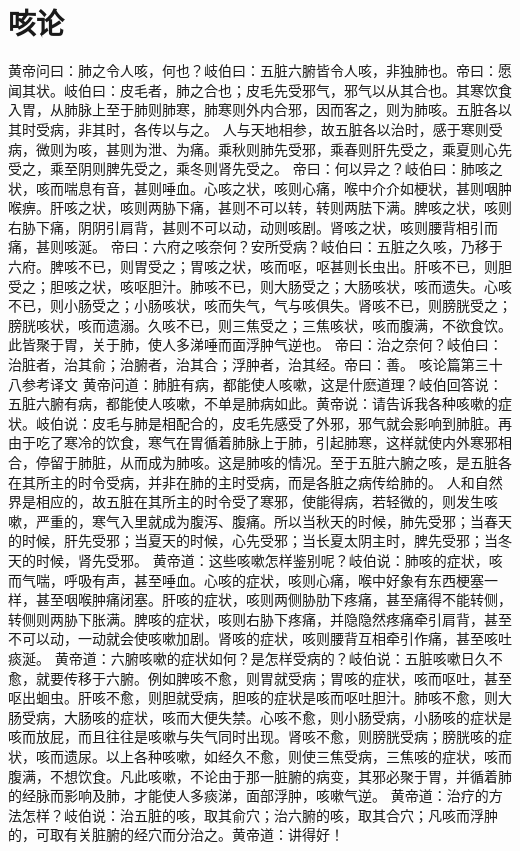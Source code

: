 \documentclass[a4paper,12pt,UTF8,twoside]{ctexbook}
\begin{document}
\chapter{咳论}
黄帝问曰：肺之令人咳，何也？岐伯曰：五脏六腑皆令人咳，非独肺也。帝曰：愿闻其状。岐伯曰：皮毛者，肺之合也；皮毛先受邪气，邪气以从其合也。其寒饮食入胃，从肺脉上至于肺则肺寒，肺寒则外内合邪，因而客之，则为肺咳。五脏各以其时受病，非其时，各传以与之。
人与天地相参，故五脏各以治时，感于寒则受病，微则为咳，甚则为泄、为痛。乘秋则肺先受邪，乘春则肝先受之，乘夏则心先受之，乘至阴则脾先受之，乘冬则肾先受之。
帝曰：何以异之？岐伯曰：肺咳之状，咳而喘息有音，甚则唾血。心咳之状，咳则心痛，喉中介介如梗状，甚则咽肿喉痹。肝咳之状，咳则两胁下痛，甚则不可以转，转则两胠下满。脾咳之状，咳则右胁下痛，阴阴引肩背，甚则不可以动，动则咳剧。肾咳之状，咳则腰背相引而痛，甚则咳涎。
帝曰：六府之咳奈何？安所受病？岐伯曰：五脏之久咳，乃移于六府。脾咳不已，则胃受之；胃咳之状，咳而呕，呕甚则长虫出。肝咳不已，则胆受之；胆咳之状，咳呕胆汁。肺咳不已，则大肠受之；大肠咳状，咳而遗失。心咳不已，则小肠受之；小肠咳状，咳而失气，气与咳俱失。肾咳不已，则膀胱受之；膀胱咳状，咳而遗溺。久咳不已，则三焦受之；三焦咳状，咳而腹满，不欲食饮。此皆聚于胃，关于肺，使人多涕唾而面浮肿气逆也。
帝曰：治之奈何？岐伯曰：治脏者，治其俞；治腑者，治其合；浮肿者，治其经。帝曰：善。
咳论篇第三十八参考译文
黄帝问道：肺脏有病，都能使人咳嗽，这是什麽道理？岐伯回答说：五脏六腑有病，都能使人咳嗽，不单是肺病如此。黄帝说：请告诉我各种咳嗽的症状。岐伯说：皮毛与肺是相配合的，皮毛先感受了外邪，邪气就会影响到肺脏。再由于吃了寒冷的饮食，寒气在胃循着肺脉上于肺，引起肺寒，这样就使内外寒邪相合，停留于肺脏，从而成为肺咳。这是肺咳的情况。至于五脏六腑之咳，是五脏各在其所主的时令受病，并非在肺的主时受病，而是各脏之病传给肺的。
人和自然界是相应的，故五脏在其所主的时令受了寒邪，使能得病，若轻微的，则发生咳嗽，严重的，寒气入里就成为腹泻、腹痛。所以当秋天的时候，肺先受邪；当春天的时候，肝先受邪；当夏天的时候，心先受邪；当长夏太阴主时，脾先受邪；当冬天的时候，肾先受邪。
黄帝道：这些咳嗽怎样鉴别呢？岐伯说：肺咳的症状，咳而气喘，呼吸有声，甚至唾血。心咳的症状，咳则心痛，喉中好象有东西梗塞一样，甚至咽喉肿痛闭塞。肝咳的症状，咳则两侧胁肋下疼痛，甚至痛得不能转侧，转侧则两胁下胀满。脾咳的症状，咳则右胁下疼痛，并隐隐然疼痛牵引肩背，甚至不可以动，一动就会使咳嗽加剧。肾咳的症状，咳则腰背互相牵引作痛，甚至咳吐痰涎。
黄帝道：六腑咳嗽的症状如何？是怎样受病的？岐伯说：五脏咳嗽日久不愈，就要传移于六腑。例如脾咳不愈，则胃就受病；胃咳的症状，咳而呕吐，甚至呕出蛔虫。肝咳不愈，则胆就受病，胆咳的症状是咳而呕吐胆汁。肺咳不愈，则大肠受病，大肠咳的症状，咳而大便失禁。心咳不愈，则小肠受病，小肠咳的症状是咳而放屁，而且往往是咳嗽与失气同时出现。肾咳不愈，则膀胱受病；膀胱咳的症状，咳而遗尿。以上各种咳嗽，如经久不愈，则使三焦受病，三焦咳的症状，咳而腹满，不想饮食。凡此咳嗽，不论由于那一脏腑的病变，其邪必聚于胃，并循着肺的经脉而影响及肺，才能使人多痰涕，面部浮肿，咳嗽气逆。
黄帝道：治疗的方法怎样？岐伯说：治五脏的咳，取其俞穴；治六腑的咳，取其合穴；凡咳而浮肿的，可取有关脏腑的经穴而分治之。黄帝道：讲得好！
\end{document}
